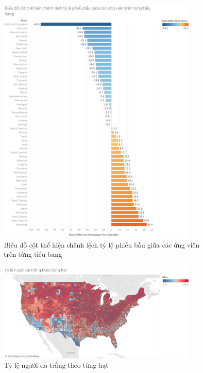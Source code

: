 \documentclass[14pt, a4paper]{article}
\numberwithin{equation}{section}
\numberwithin{figure}{section}
\numberwithin{dl}{section}
\numberwithin{md}{section}
\numberwithin{bd}{section}
\numberwithin{dn}{section}
\numberwithin{hq}{section}
\begin{document}
    \begin{figure}[h!]
        \centering
        \includegraphics[width=0.9\textwidth]{figures/State_Difference_Percentage_Total_Vote_Two_Candidate_Bar_Chart.png}
        \caption{Biểu đồ cột thể hiện chênh lệch tỷ lệ phiếu bầu giữa các ứng viên trên từng tiểu bang}
    \end{figure}

    \begin{figure}[h!]
        \centering
        \includegraphics[width=0.9\textwidth]{figures/County_Percentage_White_People.png}
        \caption{Tỷ lệ người da trắng theo từng hạt}
    \end{figure}
\end{document}
